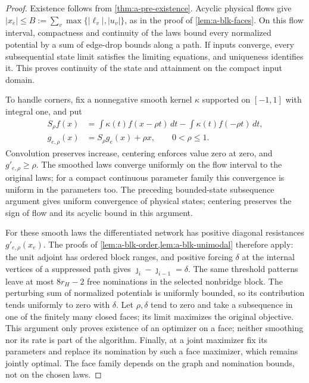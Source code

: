 \begin{proof}
Existence follows from \cref{thm:a-pre-existence}. Acyclic physical flows
give $|x_e|\le B:=\sum_v\max\{|\ell_v|,|u_v|\}$, as in the proof of
\cref{lem:a-blk-faces}. On this flow interval, compactness and continuity
of the laws bound every normalized potential by a sum of edge-drop
bounds along a path. If inputs converge, every subsequential state limit
satisfies the limiting equations, and uniqueness identifies it. This
proves continuity of the state and attainment on the compact input
domain.

To handle corners, fix a nonnegative smooth kernel $\kappa$ supported
on $[-1,1]$ with integral one, and put
\begin{align*}
 S_\rho f(x)&=\int\kappa(t)f(x-\rho t)\,dt
                  -\int\kappa(t)f(-\rho t)\,dt,\\
 g_{e,\rho}(x)&=S_\rho g_e(x)+\rho x,\qquad 0<\rho\le1.
\end{align*}
Convolution preserves increase, centering enforces value zero at zero,
and $g'_{e,\rho}\ge\rho$. The smoothed laws converge uniformly on the
flow interval to the original laws; for a compact continuous parameter
family this convergence is uniform in the parameters too. The preceding
bounded-state subsequence argument gives uniform convergence of physical
states; centering preserves the sign of flow and its acyclic bound in
this argument.

For these smooth laws the differentiated network has positive diagonal
resistances $g'_{e,\rho}(x_e)$. The proofs of
\cref{lem:a-blk-order,lem:a-blk-unimodal} therefore apply: the unit
adjoint has ordered block ranges, and positive forcing $\delta$ at the
internal vertices of a suppressed path gives
$\jmath_i-\jmath_{i-1}=\delta$. The same threshold patterns leave at
most $8r_H-2$ free nominations in the selected nonbridge block. The
perturbing sum of normalized potentials is uniformly bounded, so its
contribution tends uniformly to zero with $\delta$. Let $\rho,\delta$
tend to zero and take a subsequence in one of the finitely many closed
faces; its limit maximizes the original objective. This argument only
proves existence of an optimizer on a face; neither smoothing nor its
rate is part of the algorithm. Finally, at a joint maximizer fix its
parameters and replace its nomination by such a face maximizer, which
remains jointly optimal. The face family depends on the graph and
nomination bounds, not on the chosen laws.
\end{proof}

